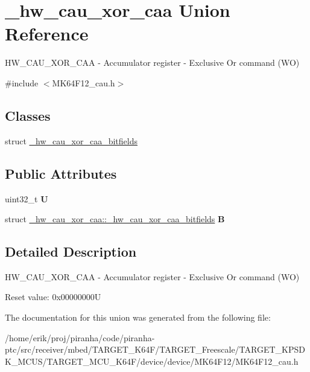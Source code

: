 \hypertarget{union__hw__cau__xor__caa}{}\section{\+\_\+hw\+\_\+cau\+\_\+xor\+\_\+caa Union Reference}
\label{union__hw__cau__xor__caa}


H\+W\+\_\+\+C\+A\+U\+\_\+\+X\+O\+R\+\_\+\+C\+AA -\/ Accumulator register -\/ Exclusive Or command (WO)  




{\ttfamily \#include $<$M\+K64\+F12\+\_\+cau.\+h$>$}

\subsection*{Classes}
\begin{DoxyCompactItemize}
\item 
struct \hyperlink{struct__hw__cau__xor__caa_1_1__hw__cau__xor__caa__bitfields}{\+\_\+hw\+\_\+cau\+\_\+xor\+\_\+caa\+\_\+bitfields}
\end{DoxyCompactItemize}
\subsection*{Public Attributes}
\begin{DoxyCompactItemize}
\item 
uint32\+\_\+t {\bfseries U}\hypertarget{union__hw__cau__xor__caa_a4ed391f5ece93720a6c682e844110bd3}{}\label{union__hw__cau__xor__caa_a4ed391f5ece93720a6c682e844110bd3}

\item 
struct \hyperlink{struct__hw__cau__xor__caa_1_1__hw__cau__xor__caa__bitfields}{\+\_\+hw\+\_\+cau\+\_\+xor\+\_\+caa\+::\+\_\+hw\+\_\+cau\+\_\+xor\+\_\+caa\+\_\+bitfields} {\bfseries B}\hypertarget{union__hw__cau__xor__caa_a290abd4ee3a19c6adf876afbd4725af7}{}\label{union__hw__cau__xor__caa_a290abd4ee3a19c6adf876afbd4725af7}

\end{DoxyCompactItemize}


\subsection{Detailed Description}
H\+W\+\_\+\+C\+A\+U\+\_\+\+X\+O\+R\+\_\+\+C\+AA -\/ Accumulator register -\/ Exclusive Or command (WO) 

Reset value\+: 0x00000000U 

The documentation for this union was generated from the following file\+:\begin{DoxyCompactItemize}
\item 
/home/erik/proj/piranha/code/piranha-\/ptc/src/receiver/mbed/\+T\+A\+R\+G\+E\+T\+\_\+\+K64\+F/\+T\+A\+R\+G\+E\+T\+\_\+\+Freescale/\+T\+A\+R\+G\+E\+T\+\_\+\+K\+P\+S\+D\+K\+\_\+\+M\+C\+U\+S/\+T\+A\+R\+G\+E\+T\+\_\+\+M\+C\+U\+\_\+\+K64\+F/device/device/\+M\+K64\+F12/M\+K64\+F12\+\_\+cau.\+h\end{DoxyCompactItemize}
